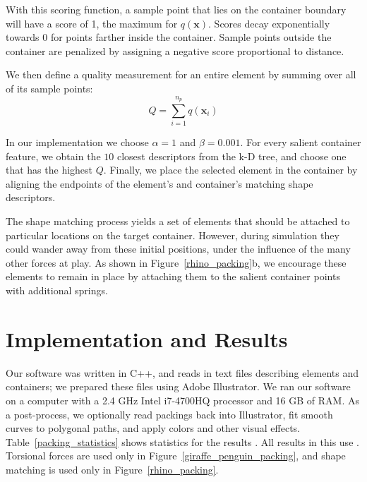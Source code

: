 With this scoring function, a sample point that lies on the container boundary
will have a score of 1, the maximum for $q(\bm{x})$.
Scores decay exponentially towards 0
for points farther inside the container.  Sample points outside the container
are penalized by assigning a negative score proportional to distance.


We then define a quality measurement for an entire element by summing over
all of its sample points:
\begin{equation}
Q = \sum_{i = 1}^{n_p} q(\bm{x}_i)
\end{equation}

In our implementation we choose $\alpha = 1$ and $\beta = 0.001$.
For every salient container feature, we obtain the $10$ closest descriptors from the k-D tree, 
and choose one that has the highest $Q$.
Finally, we place the selected element in the container by 
aligning the endpoints of the element's and container's matching shape 
descriptors.

The shape matching process yields a set of elements that should be attached
to particular locations on the target container.  However, during simulation
they could wander away from these initial positions, under the influence of
the many other forces at play.  As shown in Figure~\ref{rhino_packing}b, we
encourage these elements to remain in place by attaching them to the salient
container points with additional springs.

\section{Implementation and Results}
\label{repulsionpak_results}

Our software was written in C++, and reads in text files describing
elements and containers; we prepared these files using
Adobe Illustrator.  We ran
our software on a computer with a 2.4 GHz Intel i7-4700HQ processor
and 16 GB of RAM.  As a post-process, we optionally read packings
back into Illustrator, fit smooth curves to polygonal paths, and
apply colors and other visual effects.  Table~\ref{packing_statistics}
shows statistics for the results .  All results in this
 use .
Torsional forces are used only in Figure~\ref{giraffe_penguin_packing},
and shape matching is used only in Figure~\ref{rhino_packing}.

